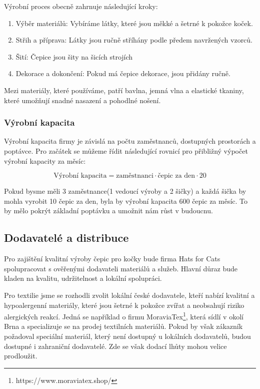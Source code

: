 \documentclass[12pt, a4paper]{article}
\begin{document}
Výrobní proces obecně zahrnuje následující kroky:

\begin{enumerate}
  \item Výběr materiálů: Vybíráme látky, které jsou měkké a šetrné k pokožce koček.
  \item Střih a příprava: Látky jsou ručně stříhány podle předem navržených vzorců.
  \item Šití: Čepice jsou šity na šicích strojích
  \item Dekorace a dokončení: Pokud má čepice dekorace, jsou přidány ručně.
\end{enumerate}

Mezi materiály, které používáme, patří bavlna, jemná vlna a elastické tkaniny, které umožňují snadné nasazení a pohodlné nošení.

\subsubsection{Výrobní kapacita}

Výrobní kapacita firmy je závislá na počtu zaměstnanců, dostupných prostorách a poptávce.
Pro začátek se můžeme řídit následující rovnicí pro přibližný výpočet výrobní kapacity za měsíc:

\begin{equation}
  \text{Výrobní kapacita} = \text{zaměstnanci} \cdot \text{čepic za den} \cdot 20
\end{equation}

Pokud bysme měli 3 zaměstnance(1 vedoucí výroby a 2 šičky) a každá šička by mohla vyrobit 10 čepic za den, byla by výrobní kapacita 600 čepic za měsíc.
To by mělo pokrýt základní poptávku a umožnit nám růst v budoucnu.

\subsection{Dodavatelé a distribuce}

Pro zajištění kvalitní výroby čepic pro kočky bude firma Hats for Cats spolupracovat s ověřenými dodavateli materiálů a služeb.
Hlavní důraz bude kladen na kvalitu, udržitelnost a lokální spolupráci.

Pro textilie jsme se rozhodli zvolit lokální české dodavatele, kteří nabízí
kvalitní a hypoalergenní materiály, které jsou šetrné k pokožce zvířat a
neobsahují riziko alergických reakcí. Jedná se například o firmu MoraviaTex\footnote{https://www.moraviatex.shop/},
která sídlí v okolí Brna a specializuje se na prodej textilních materiálů. Pokud
by však zákazník požadoval speciální materiál, který není dostupný u lokálních dodavatelů,
budou dostupné i zahraniční dodavatelé. Zde se však dodací lhůty mohou velice prodloužit.
\end{document}
